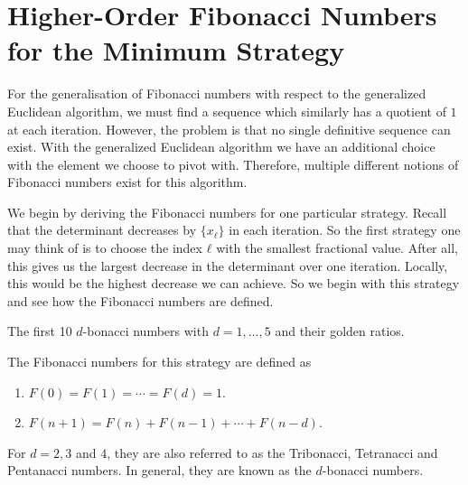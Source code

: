 \section{Higher-Order Fibonacci Numbers for the Minimum Strategy}


For the generalisation of Fibonacci numbers with respect to the generalized
Euclidean algorithm,
we must find a sequence which similarly has a quotient of $1$ at each iteration.
However, the problem is that no single definitive sequence can exist.
With the generalized Euclidean algorithm we have an additional choice with the
element we choose to pivot with.
Therefore, multiple different notions of Fibonacci numbers exist for this
algorithm.

We begin by deriving the Fibonacci numbers for one particular strategy.
Recall that the determinant decreases by $\{x_ℓ\}$ in each iteration.
So the first strategy one may think of is to choose the index $ℓ$ with the
smallest fractional value.
After all, this gives us the largest decrease in the determinant over one iteration.
Locally, this would be the highest decrease we can achieve.
So we begin with this strategy and see how the Fibonacci numbers are defined.


\begin{table}[tbp]
  \caption{The first 10 $d$-bonacci numbers with $d = 1, …, 5$ and their golden ratios.}
  \label{tbl:min-fibonacci}
  \centering
  
\end{table}

\begin{definition}
  The Fibonacci numbers for this strategy are defined as
  \begin{enumerate}
    \item $F(0) = F(1) = ⋯ = F(d) = 1$.
    \item $F(n + 1) = F(n) + F(n - 1) + ⋯ + F(n - d)$.
  \end{enumerate}
  For $d = 2, 3$ and $4$, they are also referred to as the Tribonacci, Tetranacci
  and Pentanacci numbers.
  In general, they are known as the $d$-bonacci numbers.
\end{definition}

